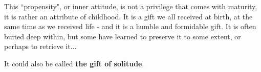 This ``propensity", or inner attitude, is not a privilege that comes with maturity, it is rather an attribute of childhood. It is a gift we all received at birth, at the same time as we received life - and it is a humble and formidable gift. It is often buried deep within, but some have learned to preserve it to some extent, or perhaps to retrieve it...

It could also be called \textbf{the gift of solitude}.


%








